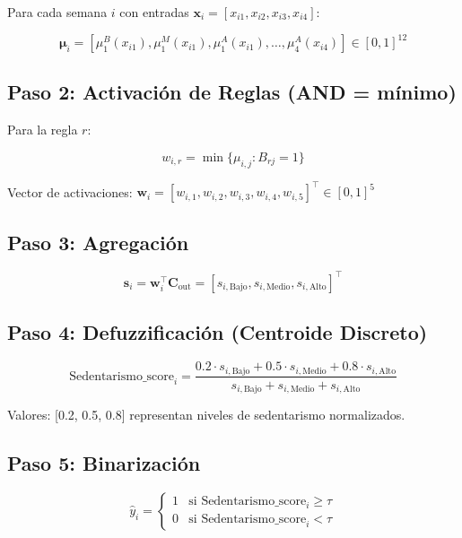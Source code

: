 \documentclass[12pt,letterpaper,twoside]{report}
\newcommand{\vect}[1]{\boldsymbol{#1}}
\newcommand{\mat}[1]{\mathbf{#1}}
\begin{document}
Para cada semana $i$ con entradas $\vect{x}_i = [x_{i1}, x_{i2}, x_{i3}, x_{i4}]$:

\begin{equation}
\vect{\mu}_i = [\mu_1^B(x_{i1}), \mu_1^M(x_{i1}), \mu_1^A(x_{i1}), \ldots, \mu_4^A(x_{i4})] \in [0,1]^{12}
\end{equation}

\subsection{Paso 2: Activación de Reglas (AND = mínimo)}

Para la regla $r$:

\begin{equation}
w_{i,r} = \min\{\mu_{i,j} : B_{rj} = 1\}
\end{equation}

Vector de activaciones: $\vect{w}_i = [w_{i,1}, w_{i,2}, w_{i,3}, w_{i,4}, w_{i,5}]^\top \in [0,1]^5$

\subsection{Paso 3: Agregación}

\begin{equation}
\vect{s}_i = \vect{w}_i^\top \mat{C}_{\text{out}} = [s_{i,\text{Bajo}}, s_{i,\text{Medio}}, s_{i,\text{Alto}}]^\top
\end{equation}

\subsection{Paso 4: Defuzzificación (Centroide Discreto)}

\begin{equation}
\text{Sedentarismo\_score}_i = \frac{0.2 \cdot s_{i,\text{Bajo}} + 0.5 \cdot s_{i,\text{Medio}} + 0.8 \cdot s_{i,\text{Alto}}}{s_{i,\text{Bajo}} + s_{i,\text{Medio}} + s_{i,\text{Alto}}}
\end{equation}

Valores: [0.2, 0.5, 0.8] representan niveles de sedentarismo normalizados.

\subsection{Paso 5: Binarización}

\begin{equation}
\hat{y}_i = 
\begin{cases}
1 & \text{si } \text{Sedentarismo\_score}_i \geq \tau \\
0 & \text{si } \text{Sedentarismo\_score}_i < \tau
\end{cases}
\end{equation}
\end{document}
